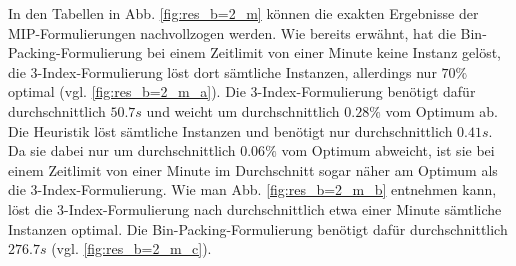 In den Tabellen in Abb. \ref{fig:res_b=2_m} können die exakten Ergebnisse der MIP-Formulierungen nachvollzogen werden.
Wie bereits erwähnt, hat die Bin-Packing-Formulierung bei einem Zeitlimit von einer Minute keine Instanz gelöst, die 3-Index-Formulierung löst dort sämtliche Instanzen, allerdings nur $70 \%$ optimal (vgl. \ref{fig:res_b=2_m_a}).
Die 3-Index-Formulierung benötigt dafür durchschnittlich $50.7s$ und weicht um durchschnittlich $0.28 \%$ vom Optimum ab.
Die Heuristik löst sämtliche Instanzen und benötigt nur durchschnittlich $0.41s$. Da sie dabei nur um durchschnittlich
$0.06 \%$ vom Optimum abweicht, ist sie bei einem Zeitlimit von einer Minute im Durchschnitt sogar näher am Optimum als die 3-Index-Formulierung. Wie man Abb. \ref{fig:res_b=2_m_b} entnehmen kann, löst die 3-Index-Formulierung nach durchschnittlich
etwa einer Minute sämtliche Instanzen optimal. Die Bin-Packing-Formulierung benötigt dafür durchschnittlich $276.7s$ (vgl.
\ref{fig:res_b=2_m_c}).

